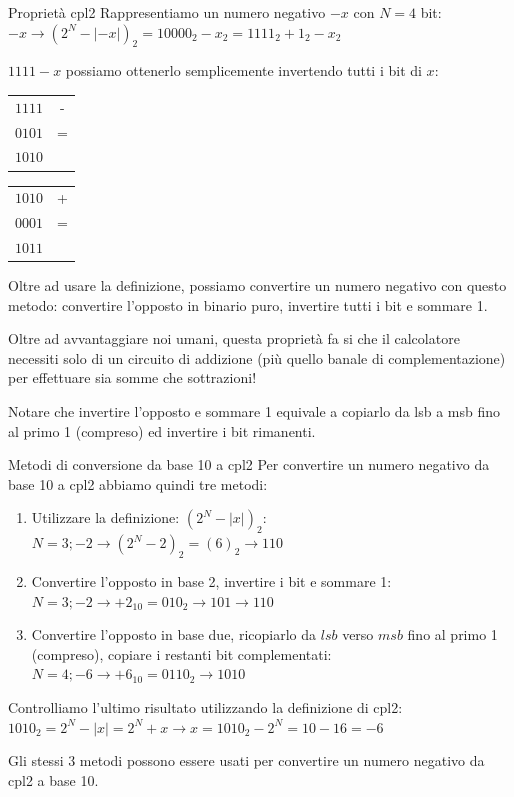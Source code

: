 \documentclass[9pt, handout]{beamer}
\begin{document}
\begin{frame}{Proprietà cpl2}
Rappresentiamo un numero negativo $-x$ con $N=4$ bit:\\ $-x \rightarrow (2^N-|-x|)_2 = 10000_2 - x_2 = 1111_2+1_2-x_2$

\pause
$1111-x$ possiamo ottenerlo semplicemente invertendo tutti i bit di $x$:
\begin{tabular}{c|c}
$1111$ & - \\
$0101$ & = \\
\hline
$1010$& \\
\end{tabular}
\hspace{2cm}
\begin{tabular}{c|c}
	$1010$ & + \\
	$0001$ & = \\
	\hline
	$1011$& \\
\end{tabular}

\pause
Oltre ad usare la definizione, possiamo convertire un numero negativo con questo metodo: convertire l'opposto in binario puro, invertire tutti i bit e sommare 1.

\pause
Oltre ad avvantaggiare noi umani, questa proprietà fa si che il calcolatore necessiti solo di un circuito di addizione (più quello banale di complementazione) per effettuare sia somme che sottrazioni!

\pause
Notare che invertire l'opposto e sommare 1 equivale a copiarlo da lsb a msb fino al primo 1 (compreso) ed invertire i bit rimanenti.
\end{frame}

\begin{frame}{Metodi di conversione da base 10 a cpl2}
Per convertire un numero negativo da base 10 a cpl2 abbiamo quindi tre metodi:
\begin{enumerate}[<+->]
\item Utilizzare la definizione: $(2^N-|x|)_2$:\\
$N=3; -2 \rightarrow (2^N-2)_2 = (6)_2 \rightarrow 110$
\item Convertire l'opposto in base 2, invertire i bit e sommare 1:\\
$N=3; -2 \rightarrow +2_{10} = 010_2 \rightarrow 101 \rightarrow 110$
\item Convertire l'opposto in base due, ricopiarlo da $lsb$ verso $msb$ fino al primo 1 (compreso), copiare i restanti bit complementati:\\
$N=4; -6 \rightarrow +6_{10} = 0110_2 \rightarrow 1010$
\end{enumerate}

\pause
Controlliamo l'ultimo risultato utilizzando la definizione di cpl2: $1010_2 = 2^N - |x| = 2^N+x \rightarrow x=1010_2-2^N = 10-16 = -6$

Gli stessi 3 metodi possono essere usati per convertire un numero negativo da cpl2 a base 10.
\end{frame}
\end{document}
